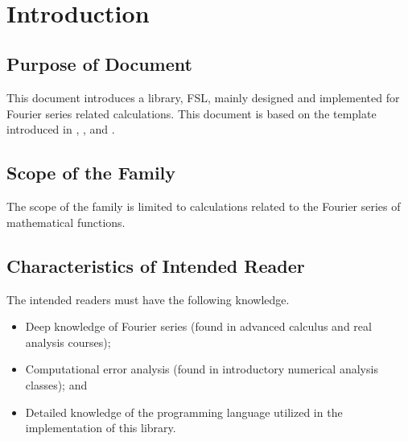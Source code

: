 \documentclass[12pt]{article}
\newcommand{\famname}{FSL} %
\begin{document}
\newpage

\tableofcontents

~\newpage


\section{Introduction}

\subsection{Purpose of Document}
This document introduces a library, \famname, mainly designed and implemented for Fourier series related calculations. This document is based on the template introduced in \cite{Smith2006}, \cite{SmithAndLai2005}, and \cite{SmithMcCutchanAndCarette2017}.

\subsection{Scope of the Family} 
The scope of the family is limited to calculations related to the Fourier series of mathematical functions.

\subsection{Characteristics of Intended Reader} 
The intended readers must have the following knowledge.
\begin{itemize}
	\item Deep knowledge of Fourier series (found in advanced calculus and real analysis courses);
	\item Computational error analysis (found in introductory numerical analysis classes); and
	\item Detailed knowledge of the programming language utilized in the implementation of this library.
	
\end{itemize}
\end{document}
